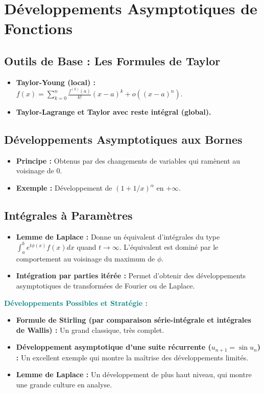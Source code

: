 \documentclass[12pt, a4paper, parskip=full]{report}
\theoremstyle{agregstyle}
\newenvironment{developpements}
  {\par\medskip\noindent\begin{oframed}\noindent\textbf{\textcolor{teal}{Développements Possibles et Stratégie :}}}
  {\end{oframed}\par\medskip}
\begin{document}
\section{Développements Asymptotiques de Fonctions}
\subsection{Outils de Base : Les Formules de Taylor}
\begin{itemize}
    \item \textbf{Taylor-Young (local) :} $f(x) = \sum_{k=0}^n \frac{f^{(k)}(a)}{k!}(x-a)^k + o((x-a)^n)$.
    \item \textbf{Taylor-Lagrange et Taylor avec reste intégral (global).}
\end{itemize}
\subsection{Développements Asymptotiques aux Bornes}
\begin{itemize}
    \item \textbf{Principe :} Obtenus par des changements de variables qui ramènent au voisinage de 0.
    \item \textbf{Exemple :} Développement de $(1+1/x)^\alpha$ en $+\infty$.
\end{itemize}
\subsection{Intégrales à Paramètres}
\begin{itemize}
    \item \textbf{Lemme de Laplace :} Donne un équivalent d'intégrales du type $\int_a^b e^{t\phi(x)}f(x)dx$ quand $t \to \infty$. L'équivalent est dominé par le comportement au voisinage du maximum de $\phi$.
    \item \textbf{Intégration par parties itérée :} Permet d'obtenir des développements asymptotiques de transformées de Fourier ou de Laplace.
\end{itemize}

\begin{developpements}
    \begin{itemize}
        \item \textbf{Formule de Stirling (par comparaison série-intégrale et intégrales de Wallis) :} Un grand classique, très complet.
        \item \textbf{Développement asymptotique d'une suite récurrente ($u_{n+1}=\sin u_n$) :} Un excellent exemple qui montre la maîtrise des développements limités.
        \item \textbf{Lemme de Laplace :} Un développement de plus haut niveau, qui montre une grande culture en analyse.
    \end{itemize}
\end{developpements}
\end{document}
